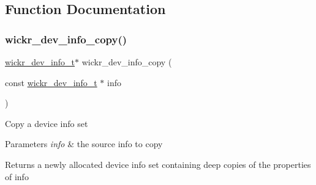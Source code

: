 \subsection{Function Documentation}
\mbox{\label{group__wickr__dev__info_ga1c9d2bdc1778166c49aec43906bb1a83}} 
\subsubsection{\texorpdfstring{wickr\+\_\+dev\+\_\+info\+\_\+copy()}{wickr\_dev\_info\_copy()}}
{\footnotesize\ttfamily \mbox{\hyperlink{structwickr__dev__info}{wickr\+\_\+dev\+\_\+info\+\_\+t}}$\ast$ wickr\+\_\+dev\+\_\+info\+\_\+copy (\begin{DoxyParamCaption}\item[{const \mbox{\hyperlink{structwickr__dev__info}{wickr\+\_\+dev\+\_\+info\+\_\+t}} $\ast$}]{info }\end{DoxyParamCaption})}

Copy a device info set


\begin{DoxyParams}{Parameters}
{\em info} & the source info to copy \\
\hline
\end{DoxyParams}
\begin{DoxyReturn}{Returns}
a newly allocated device info set containing deep copies of the properties of \textquotesingle{}info\textquotesingle{} 
\end{DoxyReturn}
\mbox{\label{group__wickr__dev__info_gaadd5ceb4c6ed757440332e8e27109e5e}} 

